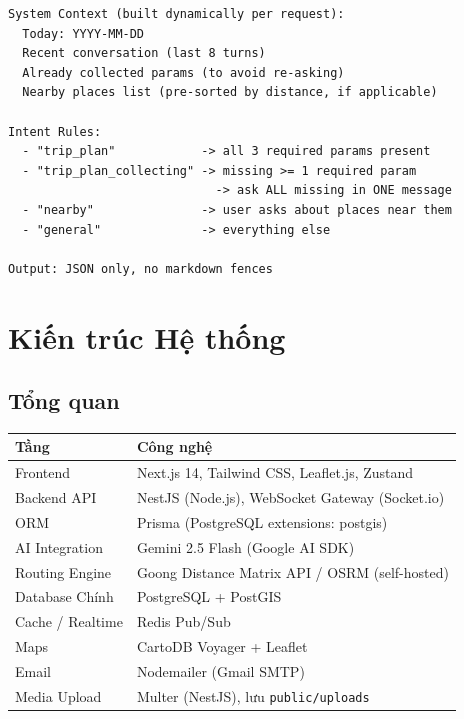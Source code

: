 \documentclass[12pt,a4paper]{article}
\begin{document}
\begin{lstlisting}[language={}]
System Context (built dynamically per request):
  Today: YYYY-MM-DD
  Recent conversation (last 8 turns)
  Already collected params (to avoid re-asking)
  Nearby places list (pre-sorted by distance, if applicable)

Intent Rules:
  - "trip_plan"            -> all 3 required params present
  - "trip_plan_collecting" -> missing >= 1 required param
                             -> ask ALL missing in ONE message
  - "nearby"               -> user asks about places near them
  - "general"              -> everything else

Output: JSON only, no markdown fences
\end{lstlisting}

\section{Kiến trúc Hệ thống}

\subsection{Tổng quan}

\begin{center}
\begin{tabular}{ll}
  \toprule
  \textbf{Tầng} & \textbf{Công nghệ} \\
  \midrule
  Frontend         & Next.js 14, Tailwind CSS, Leaflet.js, Zustand \\
  Backend API      & NestJS (Node.js), WebSocket Gateway (Socket.io) \\
  ORM              & Prisma (PostgreSQL extensions: postgis)          \\
  AI Integration   & Gemini 2.5 Flash (Google AI SDK)                 \\
  Routing Engine   & Goong Distance Matrix API / OSRM (self-hosted)  \\
  Database Chính   & PostgreSQL + PostGIS                             \\
  Cache / Realtime & Redis Pub/Sub                                    \\
  Maps             & CartoDB Voyager + Leaflet                        \\
  Email            & Nodemailer (Gmail SMTP)                          \\
  Media Upload     & Multer (NestJS), lưu \texttt{public/uploads}     \\
  \bottomrule
\end{tabular}
\end{center}
\end{document}
